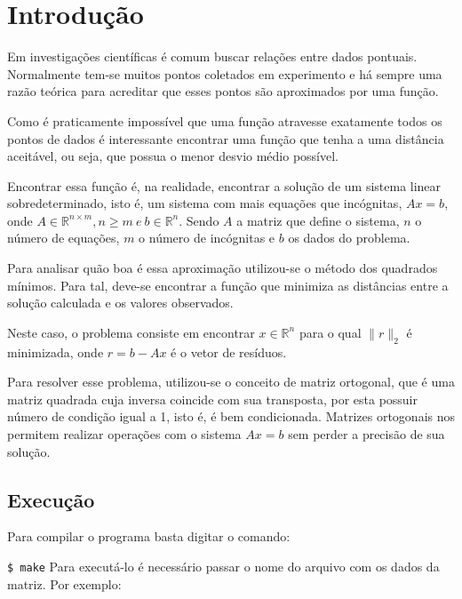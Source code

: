 \documentclass[
	12pt,				%
	openright,			%
	oneside,			%
	a4paper,			%
	english,			%
	french,				%
	spanish,			%
	brazil,				%
	]{abntex2}
\begin{document}
\chapter*[Introdução]{Introdução}

Em investigações científicas é comum buscar relações entre dados pontuais. Normalmente tem-se 
muitos pontos coletados em experimento e há sempre uma razão teórica para acreditar 
que esses pontos são aproximados por uma função.

Como é praticamente impossível que uma função atravesse exatamente todos os pontos de dados
é interessante encontrar uma função que tenha a uma distância aceitável, ou seja, que
possua o menor desvio médio possível.



Encontrar essa função é, na realidade, encontrar a solução de um sistema linear sobredeterminado,
isto é, um sistema com mais equações que incógnitas, $Ax = b$, onde 
$A \in  \mathbb{R}^{n \times m}, n \ge m \ e \ b \in \mathbb{R}^n$. Sendo $A$ a matriz que define o sistema,
$n$ o número de equações, $m$ o número de incógnitas e $b$ os dados do problema. 

Para analisar quão boa é essa aproximação utilizou-se o método dos quadrados mínimos. Para tal, deve-se encontrar a função que minimiza as distâncias entre a solução calculada e os valores observados. 

Neste caso, o problema consiste em encontrar $x \in \mathbb{R}^n$ para o qual $\|r\|_2$ é minimizada, onde $r =  b-Ax$ é o vetor de 
resíduos. 

Para resolver esse problema, utilizou-se o conceito de matriz ortogonal, que é uma matriz quadrada cuja
inversa coincide com sua transposta, por esta possuir número de condição igual a 1, isto é, é bem condicionada.
Matrizes ortogonais nos permitem realizar operações com o sistema $Ax=b$ sem perder a precisão de sua solução.

\section*{Execução}

Para compilar o programa basta digitar o comando:

\verb!$ make!
Para executá-lo é necessário passar o nome do arquivo com os dados da matriz. Por exemplo:
\end{document}
